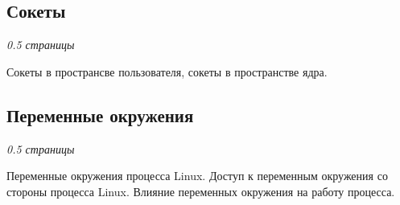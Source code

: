 \subsection{Сокеты}

\textit{0.5 страницы}

Сокеты в пространсве пользователя, сокеты в пространстве ядра.

\subsection{Переменные окружения}

\textit{0.5 страницы}

Переменные окружения процесса Linux. Доступ к переменным окружения со стороны процесса Linux. Влияние переменных окружения на работу процесса.
